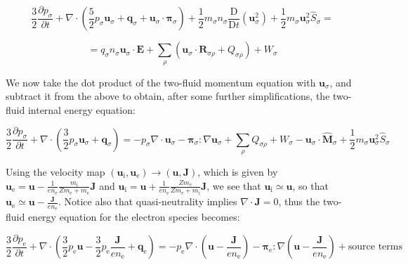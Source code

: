 \begin{equation*}
    \frac{3}{2}\frac{\partial p_\sigma}{\partial t}+\nabla\cdot \left(\frac{5}{2}p_\sigma \mathbf{u}_\sigma + \mathbf{q}_\sigma + \mathbf{u}_\sigma \cdot \boldsymbol{\pi}_\sigma\right)+\frac{1}{2}m_\sigma n_\sigma \frac{\mathrm{D}}{\mathrm{D}t}\left(\mathbf{u}_\sigma^2\right)+\frac{1}{2}m_\sigma \mathbf{u}_\sigma^2 \hat{S}_\sigma=
\end{equation*}

\begin{equation}
    = q_\sigma n_\sigma \mathbf{u}_\sigma \cdot \mathbf{E}+\sum_{\rho}\left(\mathbf{u}_\sigma \cdot \mathbf{R}_{\sigma\rho}+Q_{\sigma\rho}\right)+W_\sigma 
\end{equation}

We now take the dot product of the two-fluid momentum equation with $\mathbf{u}_\sigma$, and subtract it from the above to obtain, after some further simplifications, the two-fluid internal energy equation:

\begin{equation}
    \label{comp-24}
    \frac{3}{2}\frac{\partial p_\sigma}{\partial t}+\nabla\cdot \left(\frac{3}{2}p_\sigma \mathbf{u}_\sigma + \mathbf{q}_\sigma\right)=-p_\sigma \nabla \cdot \mathbf{u}_\sigma - \boldsymbol{\pi}_\sigma : \nabla \mathbf{u}_\sigma + \sum_{\rho} Q_{\sigma\rho} + W_\sigma - \mathbf{u}_\sigma \cdot \mathbf{\hat{M}}_\sigma + \frac{1}{2}m_\sigma \mathbf{u}_\sigma^2 \hat{S}_\sigma
\end{equation}

Using the velocity map $(\mathbf{u}_{\mathrm{i}},\mathbf{u}_{\mathrm{e}})\to(\mathbf{u},\mathbf{J})$, which is given by $\mathbf{u}_{\mathrm{e}}=\mathbf{u}-\frac{1}{en_{\mathrm{e}}}\frac{m_{\mathrm{i}}}{Zm_{\mathrm{e}}+m_{\mathrm{e}}}\mathbf{J}$ and $\mathbf{u}_{\mathrm{i}}=\mathbf{u}+\frac{1}{en_{\mathrm{e}}}\frac{Zm_{\mathrm{e}}}{Zm_{\mathrm{e}}+m_{\mathrm{i}}}\mathbf{J}$, we see that $\mathbf{u}_{\mathrm{i}}\simeq \mathbf{u}$, so that $\mathbf{u}_{\mathrm{e}}\simeq \mathbf{u}-\frac{\mathbf{J}}{en_{\mathrm{e}}}$. Notice also that quasi-neutrality implies $\nabla\cdot \mathbf{J}=0$, thus the two-fluid energy equation for the electron species becomes:

\begin{equation*}
    \frac{3}{2}\frac{\partial p_{\mathrm{e}}}{\partial t} + \nabla\cdot \left(\frac{3}{2}p_{\mathrm{e}}\mathbf{u}-\frac{3}{2}p_{\mathrm{e}}\frac{\mathbf{J}}{en_{\mathrm{e}}}+\mathbf{q}_{\mathrm{e}}\right)=-p_{\mathrm{e}}\nabla\cdot \left(\mathbf{u}-\frac{\mathbf{J}}{en_{\mathrm{e}}}\right)-\boldsymbol{\pi}_{\mathrm{e}}:\nabla \left(\mathbf{u}-\frac{\mathbf{J}}{en_{\mathrm{e}}}\right)+\text{source terms}
\end{equation*}

